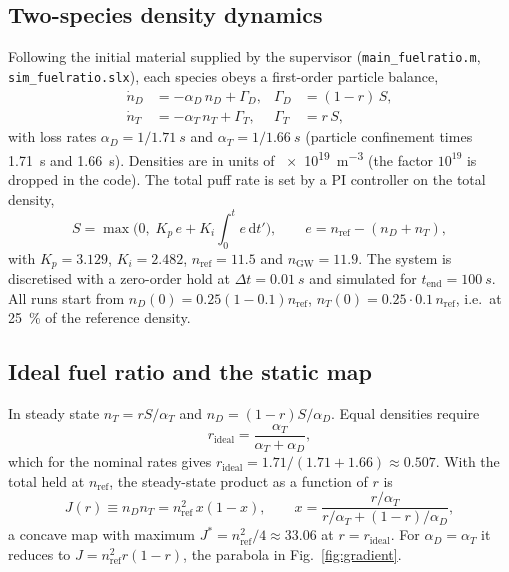 \documentclass[11pt,a4paper]{article}
\newcommand{\nD}{n_D}
\newcommand{\nT}{n_T}
\newcommand{\nref}{n_\mathrm{ref}}
\newcommand{\rid}{r_\mathrm{ideal}}
\begin{document}
\subsection{Two-species density dynamics}
Following the initial material supplied by the supervisor (\texttt{main\_fuelratio.m}, \texttt{sim\_fuelratio.slx}), each species obeys a first-order particle balance,
\begin{align}
  \dot n_D &= -\alpha_D\, n_D + \Gamma_D, & \Gamma_D &= (1-r)\,S,\\
  \dot n_T &= -\alpha_T\, n_T + \Gamma_T, & \Gamma_T &= r\,S,
\end{align}
with loss rates $\alpha_D=1/\SI{1.71}{s}$ and $\alpha_T=1/\SI{1.66}{s}$ (particle confinement times \SI{1.71}{s} and \SI{1.66}{s}).
Densities are in units of \SI{e19}{m^{-3}} (the factor $10^{19}$ is dropped in the code).
The total puff rate is set by a PI controller on the total density,
\begin{equation}
  S = \max\!\Big(0,\; K_p\,e + K_i\!\int_0^t e\,\mathrm{d}t'\Big),\qquad e=\nref-(\nD+\nT),
\end{equation}
with $K_p=3.129$, $K_i=2.482$, $\nref=11.5$ and $n_\mathrm{GW}=11.9$.
The system is discretised with a zero-order hold at $\Delta t=\SI{0.01}{s}$ and simulated for $t_\mathrm{end}=\SI{100}{s}$.
All runs start from $\nD(0)=0.25(1-0.1)\nref$, $\nT(0)=0.25\cdot0.1\,\nref$, i.e.\ at \SI{25}{\percent} of the reference density.

\subsection{Ideal fuel ratio and the static map}
In steady state $\nT=rS/\alpha_T$ and $\nD=(1-r)S/\alpha_D$. Equal densities require
\begin{equation}
  \rid = \frac{\alpha_T}{\alpha_T+\alpha_D}, \label{eq:rideal}
\end{equation}
which for the nominal rates gives $\rid = 1.71/(1.71+1.66)\approx 0.507$.
With the total held at $\nref$, the steady-state product as a function of $r$ is
\begin{equation}
  J(r)\equiv \nD\nT = \nref^2\,x(1-x),\qquad x=\frac{r/\alpha_T}{r/\alpha_T+(1-r)/\alpha_D},
  \label{eq:staticmap}
\end{equation}
a concave map with maximum $J^\ast=\nref^2/4\approx 33.06$ at $r=\rid$. For $\alpha_D=\alpha_T$ it reduces to $J=\nref^2 r(1-r)$, the parabola in Fig.~\ref{fig:gradient}.
\end{document}
